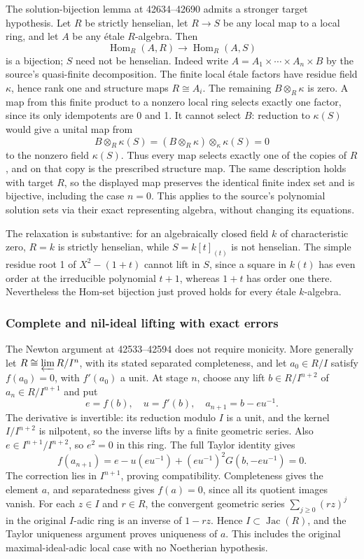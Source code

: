 The solution-bijection lemma at 42634--42690 admits a stronger target hypothesis. Let \(R\) be strictly henselian, let \(R\to S\) be any local map to a local ring, and let \(A\) be any étale \(R\)-algebra. Then \[
\operatorname{Hom}_R(A,R)\longrightarrow
\operatorname{Hom}_R(A,S)
\] is a bijection; \(S\) need not be henselian. Indeed write \(A=A_1\times\cdots\times A_n\times B\) by the source's quasi-finite decomposition. The finite local étale factors have residue field \(\kappa\), hence rank one and structure maps \(R\cong A_i\). The remaining \(B\otimes_R\kappa\) is zero. A map from this finite product to a nonzero local ring selects exactly one factor, since its only idempotents are 0 and 1. It cannot select \(B\): reduction to \(\kappa(S)\) would give a unital map from \[
B\otimes_R\kappa(S)
=(B\otimes_R\kappa)\otimes_\kappa\kappa(S)=0
\] to the nonzero field \(\kappa(S)\). Thus every map selects exactly one of the copies of \(R\), and on that copy is the prescribed structure map. The same description holds with target \(R\), so the displayed map preserves the identical finite index set and is bijective, including the case \(n=0\). This applies to the source's polynomial solution sets via their exact representing algebra, without changing its equations.

The relaxation is substantive: for an algebraically closed field \(k\) of characteristic zero, \(R=k\) is strictly henselian, while \(S=k[t]_{(t)}\) is not henselian. The simple residue root 1 of \(X^2-(1+t)\) cannot lift in \(S\), since a square in \(k(t)\) has even order at the irreducible polynomial \(t+1\), whereas \(1+t\) has order one there. Nevertheless the Hom-set bijection just proved holds for every étale \(k\)-algebra.

\subsubsection{Complete and nil-ideal lifting with exact errors}\label{complete-and-nil-ideal-lifting-with-exact-errors}

The Newton argument at 42533--42594 does not require monicity. More generally let \(R\cong\varprojlim R/I^n\), with its stated separated completeness, and let \(a_0\in R/I\) satisfy \(f(a_0)=0\), with \(f'(a_0)\) a unit. At stage \(n\), choose any lift \(b\in R/I^{n+2}\) of \(a_n\in R/I^{n+1}\) and put \[
e=f(b),\quad u=f'(b),\quad a_{n+1}=b-eu^{-1}.
\] The derivative is invertible: its reduction modulo \(I\) is a unit, and the kernel \(I/I^{n+2}\) is nilpotent, so the inverse lifts by a finite geometric series. Also \(e\in I^{n+1}/I^{n+2}\), so \(e^2=0\) in this ring. The full Taylor identity gives \[
f(a_{n+1})=e-u(eu^{-1})
              +(eu^{-1})^2G(b,-eu^{-1})=0.
\] The correction lies in \(I^{n+1}\), proving compatibility. Completeness gives the element \(a\), and separatedness gives \(f(a)=0\), since all its quotient images vanish. For each \(z\in I\) and \(r\in R\), the convergent geometric series \(\sum_{j\ge0}(rz)^j\) in the original \(I\)-adic ring is an inverse of \(1-rz\). Hence \(I\subset\operatorname{Jac}(R)\), and the Taylor uniqueness argument proves uniqueness of \(a\). This includes the original maximal-ideal-adic local case with no Noetherian hypothesis.

